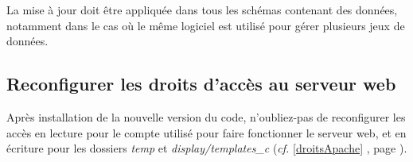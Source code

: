 La mise à jour doit être appliquée dans tous les schémas contenant des données, notamment dans le cas où le même logiciel est utilisé pour gérer plusieurs jeux de données.

\subsection{Reconfigurer les droits d'accès au serveur web}

Après installation de la nouvelle version du code, n'oubliez-pas de reconfigurer les accès en lecture pour le compte utilisé pour faire fonctionner le serveur web, et en écriture pour les dossiers \textit{temp} et \textit{display/templates\_c} (\textit{cf.} \ref{droitsApache} \textit{}, page \pageref{droitsApache}).
